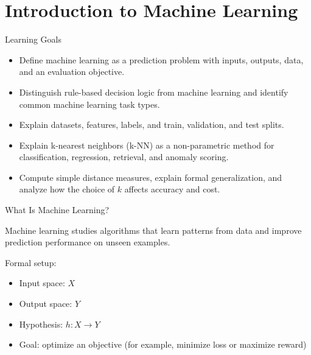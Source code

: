 \section{Introduction to Machine Learning}

\begin{frame}{Learning Goals}
\begin{itemize}
  \item Define machine learning as a prediction problem with inputs, outputs, data, and an evaluation objective.
  \pause
  \item Distinguish rule-based decision logic from machine learning and identify common machine learning task types.
  \pause
  \item Explain datasets, features, labels, and train, validation, and test splits.
  \pause
  \item Explain k-nearest neighbors (k-NN) as a non-parametric method for classification, regression, retrieval, and anomaly scoring.
  \pause
  \item Compute simple distance measures, explain formal generalization, and analyze how the choice of $k$ affects accuracy and cost.
\end{itemize}
\end{frame}

\begin{frame}{What Is Machine Learning?}
\begin{rldefinition}
Machine learning studies algorithms that learn patterns from data and improve
prediction performance on unseen examples.
\end{rldefinition}

\vspace{0.5em}
Formal setup:
\begin{itemize}
  \item Input space: $X$
  \pause
  \item Output space: $Y$
  \pause
  \item Hypothesis: $h: X \to Y$
  \pause
  \item Goal: optimize an objective (for example, minimize loss or maximize reward)
\end{itemize}
\end{frame}

